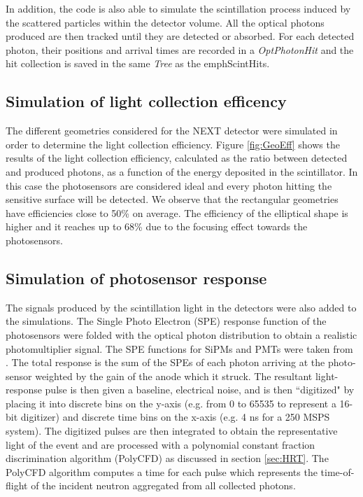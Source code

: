
In addition, the code is also able to simulate the scintillation process induced by the scattered particles within the detector volume. All the optical photons produced are then tracked until they are detected or absorbed. For each detected photon, their positions and arrival times are recorded in  a \emph{OptPhotonHit} and the hit collection is saved in the same  \emph{Tree} as the emph{ScintHits}.

\subsection{Simulation of light collection efficency}

The different geometries considered for the NEXT detector were simulated in order to determine the light collection efficiency. Figure \ref{fig:GeoEff} shows the results of the light collection efficiency, calculated as the ratio between detected and produced photons, as a function of the energy deposited in the scintillator. In this case the photosensors are considered ideal and every photon hitting the sensitive surface will be detected. We observe that the rectangular geometries have efficiencies close to 50\% on average. The efficiency of the elliptical shape is higher and it reaches up to 68\% due to the focusing effect towards the photosensors.

\subsection{Simulation of photosensor response} \label{sec:photosensorResponse}

The signals produced by the scintillation light in the detectors were  also added  to the simulations. The Single Photo Electron (SPE) response function of the photosensors were folded with the optical photon distribution to obtain a realistic photomultiplier signal. The SPE functions for SiPMs and PMTs were taken from \cite{Choong2009}. The total response is the sum of the SPEs of each photon arriving at the photo-sensor weighted by the gain of the anode which it struck. The resultant light-response pulse is then given a baseline, electrical noise, and is then ``digitized" by placing it into discrete bins on the y-axis (e.g. from 0 to 65535 to represent a 16-bit digitizer) and discrete time bins on the x-axis (e.g. 4 ns for a 250 MSPS system). The digitized pulses are then integrated to obtain the representative light of the event and are processed with a polynomial constant fraction discrimination algorithm (PolyCFD) \cite{PhDCory} as discussed in section \ref{sec:HRT}. The PolyCFD algorithm computes a time for each pulse which represents the time-of-flight of the incident neutron aggregated from all collected photons. 


